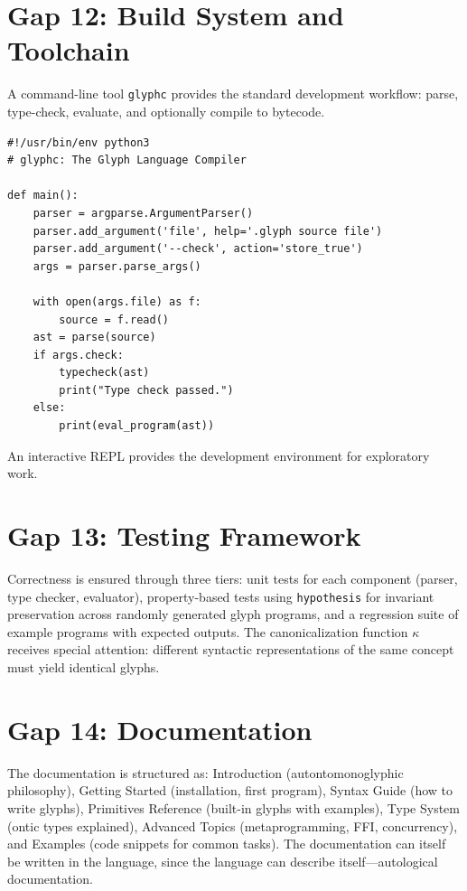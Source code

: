 \documentclass[12pt, letterpaper]{book}
\begin{document}
\section{Gap 12: Build System and Toolchain}

A command-line tool \texttt{glyphc} provides the standard development workflow: parse, type-check, evaluate, and optionally compile to bytecode.

\begin{verbatim}
#!/usr/bin/env python3
# glyphc: The Glyph Language Compiler

def main():
    parser = argparse.ArgumentParser()
    parser.add_argument('file', help='.glyph source file')
    parser.add_argument('--check', action='store_true')
    args = parser.parse_args()

    with open(args.file) as f:
        source = f.read()
    ast = parse(source)
    if args.check:
        typecheck(ast)
        print("Type check passed.")
    else:
        print(eval_program(ast))
\end{verbatim}

An interactive REPL provides the development environment for exploratory work.

\section{Gap 13: Testing Framework}

Correctness is ensured through three tiers: unit tests for each component (parser, type checker, evaluator), property-based tests using \texttt{hypothesis} for invariant preservation across randomly generated glyph programs, and a regression suite of example programs with expected outputs. The canonicalization function $\kappa$ receives special attention: different syntactic representations of the same concept must yield identical glyphs.

\section{Gap 14: Documentation}

The documentation is structured as: Introduction (autontomonoglyphic philosophy), Getting Started (installation, first program), Syntax Guide (how to write glyphs), Primitives Reference (built-in glyphs with examples), Type System (ontic types explained), Advanced Topics (metaprogramming, FFI, concurrency), and Examples (code snippets for common tasks). The documentation can itself be written in the language, since the language can describe itself---autological documentation.
\end{document}
